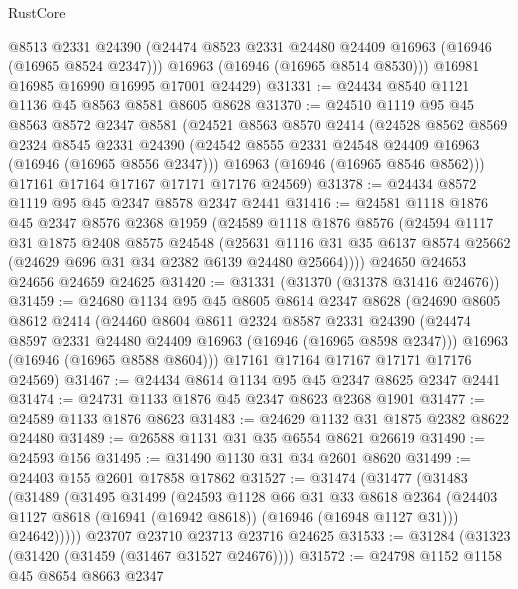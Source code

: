 \begin{lexlean}{RustCore}
\begin{coremodule}
        @8513
        @2331
        @24390
        (@24474 @8523 @2331 @24480 @24409 @16963 (@16946 (@16965 @8524 @2347)))
        @16963
        (@16946 (@16965 @8514 @8530)))
      @16981
      @16985
      @16990
      @16995
      @17001
      @24429)
@31331 := @24434 @8540 @1121 @1136 @45 @8563 @8581 @8605 @8628
@31370 := @24510
    @1119
    @95
    @45
    @8563
    @8572
    @2347
    @8581
    (@24521
      @8563
      @8570
      @2414
      (@24528
        @8562
        @8569
        @2324
        @8545
        @2331
        @24390
        (@24542 @8555 @2331 @24548 @24409 @16963 (@16946 (@16965 @8556 @2347)))
        @16963
        (@16946 (@16965 @8546 @8562)))
      @17161
      @17164
      @17167
      @17171
      @17176
      @24569)
@31378 := @24434 @8572 @1119 @95 @45 @2347 @8578 @2347 @2441
@31416 := @24581
    @1118
    @1876
    @45
    @2347
    @8576
    @2368
    @1959
    (@24589
      @1118
      @1876
      @8576
      (@24594
        @1117
        @31
        @1875
        @2408
        @8575
        @24548
        (@25631 @1116 @31 @35 @6137 @8574 @25662 (@24629 @696 @31 @34 @2382 @6139 @24480 @25664))))
    @24650
    @24653
    @24656
    @24659
    @24625
@31420 := @31331 (@31370 (@31378 @31416 @24676))
@31459 := @24680
    @1134
    @95
    @45
    @8605
    @8614
    @2347
    @8628
    (@24690
      @8605
      @8612
      @2414
      (@24460
        @8604
        @8611
        @2324
        @8587
        @2331
        @24390
        (@24474 @8597 @2331 @24480 @24409 @16963 (@16946 (@16965 @8598 @2347)))
        @16963
        (@16946 (@16965 @8588 @8604)))
      @17161
      @17164
      @17167
      @17171
      @17176
      @24569)
@31467 := @24434 @8614 @1134 @95 @45 @2347 @8625 @2347 @2441
@31474 := @24731 @1133 @1876 @45 @2347 @8623 @2368 @1901
@31477 := @24589 @1133 @1876 @8623
@31483 := @24629 @1132 @31 @1875 @2382 @8622 @24480
@31489 := @26588 @1131 @31 @35 @6554 @8621 @26619
@31490 := @24593 @156
@31495 := @31490 @1130 @31 @34 @2601 @8620
@31499 := @24403 @155 @2601 @17858 @17862
@31527 := @31474
    (@31477
      (@31483
        (@31489
          (@31495
            @31499
            (@24593
              @1128
              @66
              @31
              @33
              @8618
              @2364
              (@24403 @1127 @8618 (@16941 (@16942 @8618)) (@16946 (@16948 @1127 @31)))
              @24642)))))
    @23707
    @23710
    @23713
    @23716
    @24625
@31533 := @31284 (@31323 (@31420 (@31459 (@31467 @31527 @24676))))
@31572 := @24798
    @1152
    @1158
    @45
    @8654
    @8663
    @2347

\end{coremodule}
\end{lexlean}
